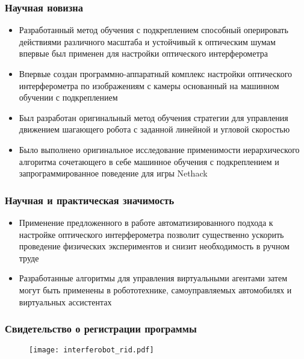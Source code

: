 \begin{frame}
    \frametitle{Научная новизна}
    \begin{itemize}
        \item Разработанный метод обучения с подкреплением способный оперировать действиями различного масштаба и устойчивый к оптическим шумам впервые был применен для настройки оптического интерферометра
        \item Впервые создан программно-аппаратный комплекс настройки оптического интерферометра по изображениям с камеры основанный на машинном обучении с подкреплением
        \item Был разработан оригинальный метод обучения стратегии для управления движением шагающего робота с заданной линейной и угловой скоростью
        \item Было выполнено оригинальное исследование применимости иерархического алгоритма сочетающего в себе машинное обучения с подкреплением и запрограммированное поведение для игры Nethack
    \end{itemize}
\end{frame}

\begin{frame}
    \frametitle{Научная и практическая значимость}
    \begin{itemize}
        \item Применение предложенного в работе автоматизированного подхода к настройке оптического интерферометра позволит существенно ускорить проведение физических экспериментов и снизит необходимость в ручном труде
        \item Разработанные алгоритмы для управления виртуальными агентами затем могут быть применены в робототехнике, самоуправляемых автомобилях и виртуальных ассистентах
    \end{itemize}
\end{frame}

\begin{frame}
    \frametitle{Свидетельство о регистрации программы}
    \begin{figure}[h]
        \centering
        \texttt{[image: interferobot\_rid.pdf]}
    \end{figure}
\end{frame}


